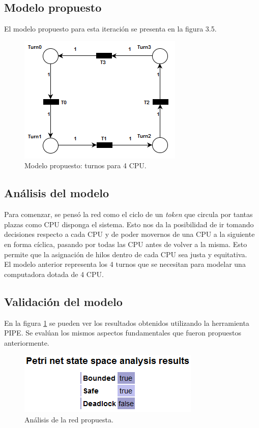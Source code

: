\documentclass[a4paper]{book}
\begin{document}
\subsection{Modelo propuesto}
El modelo propuesto para esta iteraci\'on se presenta en la figura 3.5.

\begin{figure} [H]
	\begin{center}
	    \includegraphics[scale=1]{./imagenes/it3modelored.png}
		\caption{Modelo propuesto: turnos para 4 CPU.}
	\end{center}
\end{figure}

\subsection{An\'alisis del modelo}
Para comenzar, se pens\'o la red como el ciclo de un \emph{token} que circula por tantas plazas como CPU disponga el sistema. Esto nos da la posibilidad de ir tomando decisiones respecto a cada CPU y de poder movernos de una CPU a la siguiente en forma c\'iclica, pasando por todas las CPU antes de volver a la misma. Esto permite que la asignaci\'on de hilos dentro de cada CPU sea justa y equitativa.\\

El modelo anterior representa los 4 turnos que se necesitan para modelar una computadora dotada de 4 CPU.

\subsection{Validaci\'on del modelo}
En la figura \ref{Fig:validacion3} se pueden ver los resultados obtenidos utilizando la herramienta PIPE. Se eval\'uan los mismos aspectos fundamentales que fueron propuestos anteriormente.

\begin{figure} [H]
	\begin{center}
        \includegraphics[scale=0.7]{./imagenes/it3validacion.png}
		\caption{An\'alisis de la red propuesta.}
		\label{Fig:validacion3}
	\end{center}
\end{figure}
\end{document}
